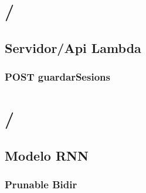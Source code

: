 \section{\accelcapture/}
\subsection{Servidor/Api Lambda}\label{app:code:accelcapturelambda}
\subsubsection{POST guardarSesions}


\section{\ifell/ }
\subsection{Modelo RNN}
\subsubsection{Prunable Bidir}\label{app:code:ifell:prunebidir}

